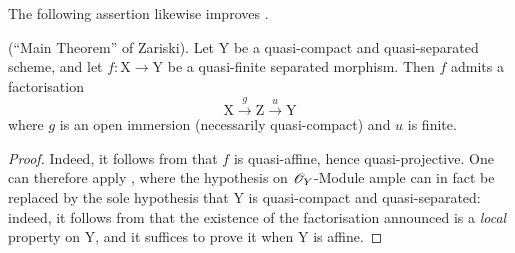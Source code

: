 The following assertion likewise improves .

\begin{corollary}[18.12.13]
\label{IV.18.12.13}
(``Main Theorem'' of Zariski).
Let $\mathrm{Y}$ be a quasi-compact and quasi-separated scheme, and let $f:\mathrm{X}\to\mathrm{Y}$ be a quasi-finite separated morphism.
Then $f$ admits a factorisation
\[
  \mathrm{X}\xrightarrow{g}\mathrm{Z}\xrightarrow{u}\mathrm{Y}
\]
where $g$ is an open immersion (necessarily quasi-compact) and $u$ is finite.
\end{corollary}

\begin{proof}
Indeed, it follows from  that $f$ is quasi-affine, hence quasi-projective.
One can therefore apply , where the hypothesis on $\mathscr{O}_Y$-Module ample can in fact be replaced by the sole hypothesis that $\mathrm{Y}$ is quasi-compact and quasi-separated: indeed, it follows from  that the existence of the factorisation announced is a \emph{local} property on $\mathrm{Y}$, and it suffices to prove it when $\mathrm{Y}$ is affine.
\end{proof}

